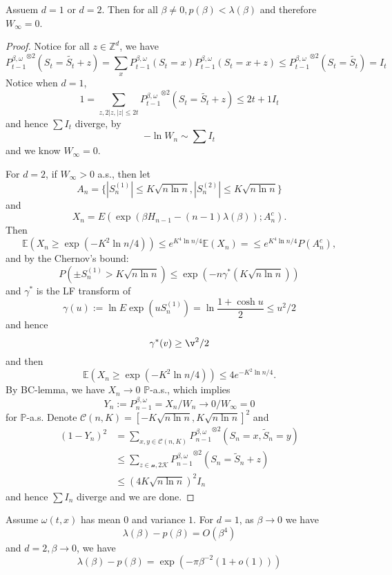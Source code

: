 \begin{theorem}
    Assuem $d = 1$ or $d=2$. Then for all $\beta \neq 0, p(\beta) < \lambda(\beta)$ and therefore $W_{\infty} = 0$.
\end{theorem}
\begin{proof}
    Notice for all $z\in \mathbb{Z}^d$, we have
    \[
    {P_{t-1}^{\beta,\omega}}^{\otimes 2}(S_t = \tilde{S_t}+z) = \sum\limits_{x} P_{t-1}^{\beta,\omega}(S_t= x)P_{t-1}^{\beta,\omega}(S_t= x+z) \leq {P_{t-1}^{\beta,\omega}}^{\otimes 2}(S_t = \tilde{S_t}) = I_t 
    \]
    Notice when $d=1$,
    \[
    1 = \sum_{z, 2|z,|z| \leq 2t} {P_{t-1}^{\beta,\omega}}^{\otimes 2}(S_t = \tilde{S_t}+z) \leq 2t+1 I_t
    \]
    and hence $\sum I_t$ diverge, by
    \[
    -\ln W_n \sim \sum I_t
    \]
    and we know $W_{\infty} = 0$.\par
    For $d=2$, if $W_{\infty} > 0$ a.s., then let
    \[
    A_n = \{|S_n^{(1)}|\leq K\sqrt{n\ln n},|S_n^{(2)}|\leq K\sqrt{n\ln n}\}
    \]
    and
    \[
    X_n = E(\exp(\beta H_{n-1} - (n-1)\lambda(\beta)); A_n^c).
    \]
    Then
    \[
    \mathbb{E}\left(X_n \geq \exp(-K^2\ln n/4)\right) \leq e^{K^4 \ln n /4} \mathbb{E}(X_n) = \leq e^{K^4 \ln n /4}P(A_n^c),
    \]
    and by the Chernov's bound:
    \[
    P(\pm S_n^{(1)} > K\sqrt{n\ln n}) \leq \exp(-n\gamma^*(K\sqrt{n\ln n}))
    \]
    and $\gamma^*$ is the LF transform of
    \[
    \gamma(u):=\ln E\exp(uS_n^{(1)}) = \ln\dfrac{1+\cosh u}{2} \leq u^2/2
    \]
    and hence
    \[
    \gamma^*(v) \geq \v^2/2
    \]
    and then
    \[
    \mathbb{E}(X_n \geq \exp(-K^2\ln n /4)) \leq 4e^{-K^2 \ln n/4}.
    \]
    By BC-lemma, we have $X_n \to 0$ $\mathbb{P}$-a.s., which implies
    \[
    Y_n:= P_{n-1}^{\beta,\omega} = X_n/W_n \to 0/W_{\infty} = 0
    \]
    for $\mathbb{P}$-a.s. Denote $\mathcal{C}(n,K) = [-K\sqrt{n\ln n}, K\sqrt{n\ln n}]^2$ and
    \[
    \begin{aligned}
        (1-Y_n)^2 &= \sum\limits_{x,y\in \mathcal{C}(n,K)}{P_{n-1}^{\beta,\omega}}^{\otimes 2}(S_n = x, \tilde{S}_n = y) \\
        &\leq \sum\limits_{z\in \mathcal{n,2K}}{P_{n-1}^{\beta,\omega}}^{\otimes 2}(S_n = \tilde{S}_n + z) \\
        &\leq (4K\sqrt{n\ln n})^2I_n
    \end{aligned}
    \]
    and hence $\sum I_n$ diverge and we are done.
\end{proof}

\begin{theorem}
    Assume $\omega(t,x)$ has mean $0$ and variance $1$. For $d = 1$, as $\beta \to 0$ we have
    \[
    \lambda(\beta) - p(\beta) = O(\beta^4)
    \]
    and $d= 2, \beta \to 0$, we have
    \[\lambda(\beta) - p(\beta) = \exp(-\pi\beta^{-2}(1+o(1)))\]
\end{theorem}

